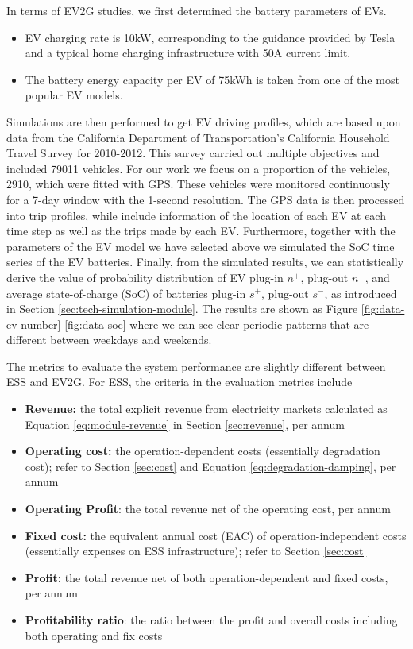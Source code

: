 In terms of EV2G studies, we first determined the battery parameters of EVs.

\begin{itemize}
	\item EV charging rate is 10kW, corresponding to the guidance provided by Tesla\cite{Tesla2} and a typical home charging infrastructure with 50A current limit. 
	\item The battery energy capacity per EV of 75kWh is taken from one of the most popular EV models\cite{Tesla3}.
\end{itemize}

Simulations are then performed to get EV driving profiles, which are based upon data from the California Department of Transportation's California Household Travel Survey for 2010-2012\cite{NREL_TSDC}. This survey carried out multiple objectives and included 79011 vehicles. For our work we focus on a proportion of the vehicles, 2910, which were fitted with GPS. These vehicles were monitored continuously for a 7-day window with the 1-second resolution. The GPS data is then processed into trip profiles, while include information of the location of each EV at each time step as well as the trips made by each EV. Furthermore, together with the parameters of the EV model we have selected above we simulated the SoC time series of the EV batteries. Finally, from the simulated results, we can statistically derive the value of probability distribution of EV plug-in $n^+$, plug-out $n^-$, and average state-of-charge (SoC) of batteries plug-in $s^+$, plug-out $s^-$, as introduced in Section \ref{sec:tech-simulation-module}. The results are shown as Figure \ref{fig:data-ev-number}-\ref{fig:data-soc} where we can see clear periodic patterns that are different between weekdays and weekends.

The metrics to evaluate the system performance are slightly different between ESS and EV2G. For ESS, the criteria in the evaluation metrics include
\begin{itemize}
	\item \textbf{Revenue:} the total explicit revenue from electricity markets calculated as Equation \eqref{eq:module-revenue} in Section \ref{sec:revenue}, per annum
	\item \textbf{Operating cost:} the operation-dependent costs (essentially degradation cost); refer to Section \ref{sec:cost} and Equation \eqref{eq:degradation-damping}, per annum
	\item \textbf{Operating Profit}: the total revenue net of the operating cost, per annum
	\item \textbf{Fixed cost:} the equivalent annual cost (EAC) of operation-independent costs (essentially expenses on ESS infrastructure); refer to Section \ref{sec:cost}
	\item \textbf{Profit:} the total revenue net of both operation-dependent and fixed costs, per annum
	\item  \textbf{Profitability ratio}: the ratio between the profit and overall costs including both operating and fix costs
\end{itemize}

